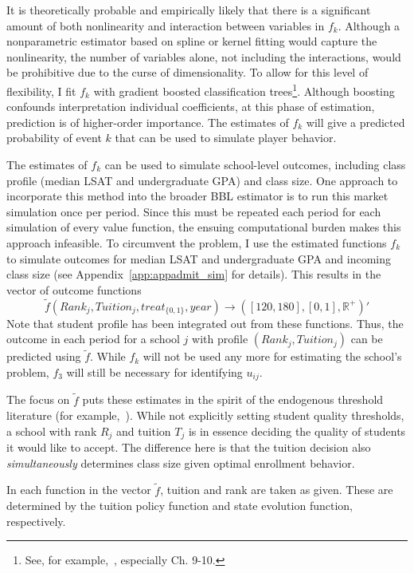 \documentclass[12pt]{article}
\theoremstyle{definition}
\begin{document}
It is theoretically probable and empirically likely that there is a significant amount of both nonlinearity and interaction between variables in $f_k$. Although a nonparametric estimator based on spline or kernel fitting would capture the nonlinearity, the number of variables alone, not including the interactions, would be prohibitive due to the curse of dimensionality. To allow for this level of flexibility, I fit $f_k$ with gradient boosted classification trees\footnote{See, for example,~\cite{esl}, especially Ch. 9-10.}. Although boosting confounds interpretation individual coefficients, at this phase of estimation, prediction is of higher-order importance. The estimates of $f_k$ will give a predicted probability of event $k$ that can be used to simulate player behavior.

The estimates of $f_k$ can be used to simulate school-level outcomes, including class profile (median LSAT and undergraduate GPA) and class size. One approach to incorporate this method into the broader BBL estimator is to run this market simulation once per period. Since this must be repeated each period for each simulation of every value function, the ensuing computational burden makes this approach infeasible. To circumvent the problem, I use the estimated functions $f_k$ to simulate outcomes for median LSAT and undergraduate GPA and incoming class size (see Appendix~\ref{app:appadmit_sim} for details). This results in the vector of outcome functions
\begin{equation}
  \tilde{f}(Rank_j, Tuition_j, treat_{\{0, 1\}}, year) \rightarrow
  ([120, 180], [0,1], \mathbb{R}^+)'
  \label{eq:fs_appadmit_outcome}
\end{equation}
Note that student profile has been integrated out from these functions. Thus, the outcome in each period for a school $j$ with profile $(Rank_j, Tuition_j)$ can be predicted using $\tilde{f}$. While $f_k$ will not be used any more for estimating the school's problem, $f_{3}$ will still be necessary for identifying $u_{ij}$.

The focus on $\tilde{f}$ puts these estimates in the spirit of the endogenous threshold literature (for example,~\cite{Azevedo}). While not explicitly setting student quality thresholds, a school with rank $R_j$ and tuition $T_j$ is in essence deciding the quality of students it would like to accept. The difference here is that the tuition decision also \emph{simultaneously} determines class size given optimal enrollment behavior.

In each function in the vector $\tilde{f}$, tuition and rank are taken as given. These are determined by the tuition policy function and state evolution function, respectively.
\end{document}
